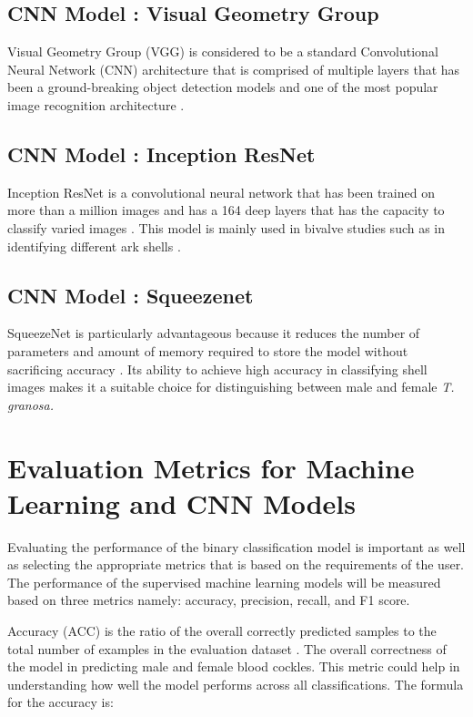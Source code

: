 \subsection{CNN Model : Visual Geometry Group}
Visual Geometry Group (VGG) is considered to be a standard Convolutional Neural Network (CNN) architecture that is comprised of multiple layers that has been a ground-breaking object detection models and one of the most popular image recognition architecture \cite{boesch2021}. 

\subsection{CNN Model : Inception ResNet}
Inception ResNet is a convolutional neural network that has been trained on more than a million images and has a  164 deep layers that has the capacity to classify varied images \cite{mathworks}. This model is mainly used in bivalve studies such as in identifying different ark shells \cite{kim2024}.  

\subsection{CNN Model : Squeezenet}
SqueezeNet is particularly advantageous because it reduces the number of parameters and amount of memory required to store the model without sacrificing accuracy \cite{koonce2021}. Its ability to achieve high accuracy in classifying shell images makes it a suitable choice for distinguishing between male and female \textit{T. granosa.}

\section{Evaluation Metrics for Machine Learning and CNN Models}
Evaluating the performance of the binary classification model is important as well as selecting the appropriate metrics that is based on the requirements of the user. The performance of the supervised machine learning models will be measured based on three metrics namely: accuracy, precision, recall, and F1 score. 

Accuracy (ACC) is the ratio of the overall correctly predicted samples to the total number of examples in the evaluation dataset \cite{cui2020}. The overall correctness of the model in predicting male and female blood cockles. This metric could help in understanding how well the model performs across all classifications. The formula for the accuracy is: 

